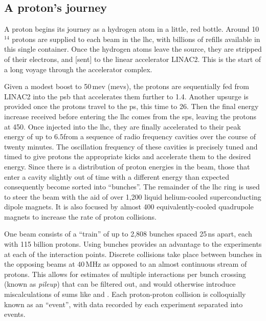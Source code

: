 

\subsection{A proton's journey}
\label{subsec:protons_journey}

A proton begins its journey as a hydrogen atom in a little, red bottle. Around 10$^{\text{14}}$ protons are supplied to each beam in the \acrshort{lhc}, with billions of refills available in this single container. Once the hydrogen atoms leave the source, they are stripped of their electrons, and [sent] to the linear accelerator LINAC2. This is the start of a long voyage through the accelerator complex.

Given a modest boost to 50\,\acrshort{mev} (\acrlong{mev}s), the protons are sequentially fed from LINAC2 into the \acrfull{psb} that accelerates them further to 1.4\GeV. Another upsurge is provided once the protons travel to the \acrfull{ps}, this time to 26\GeV. Then the final energy increase received before entering the \acrshort{lhc} comes from the \acrfull{sps}, leaving the protons at 450\GeV. Once injected into the \acrshort{lhc}, they are finally accelerated to their peak energy of up to 6.5\TeV from a sequence of radio frequency cavities over the course of twenty minutes. The oscillation frequency of these cavities is precisely tuned and timed to give protons the appropriate kicks and accelerate them to the desired energy. Since there is a distribution of proton energies in the beam, those that enter a cavity slightly out of time with a different energy than expected consequently become sorted into ``bunches''. The remainder of the \acrshort{lhc} ring is used to steer the beam with the aid of over 1,200 liquid helium-cooled superconducting dipole magnets. It is also focused by almost 400 equivalently-cooled quadrupole magnets to increase the rate of proton collisions.

One beam consists of a ``train'' of up to 2,808 bunches spaced 25\,ns apart, each with 115 billion protons. Using bunches provides an advantage to the experiments at each of the interaction points. Discrete collisions take place between bunches in the opposing beams at 40\,MHz as opposed to an almost continuous stream of protons. This allows for estimates of multiple interactions per bunch crossing (known as \emph{\gls{pileup}}) that can be filtered out, and would otherwise introduce miscalculations of sums like \ptmiss and \HT. Each proton-proton collision is colloquially known as an ``event'', with data recorded by each experiment separated into events.

